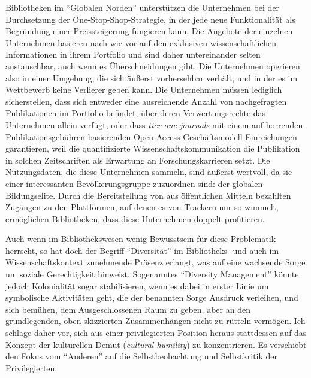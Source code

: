 \documentclass[a4paper,
fontsize=11pt,
oneside,
numbers=noperiodatend,
parskip=half-,
bibliography=totoc,
final
]{scrartcl}
\begin{document}
Bibliotheken im \enquote{Globalen Norden} unterstützen die Unternehmen
bei der Durchsetzung der One-Stop-Shop-Strategie, in der jede neue
Funktionalität als Begründung einer Preissteigerung fungieren kann. Die
Angebote der einzelnen Unternehmen basieren nach wie vor auf den
exklusiven wissenschaftlichen Informationen in ihrem Portfolio und sind
daher untereinander selten austauschbar, auch wenn es Überschneidungen
gibt. Die Unternehmen operieren also in einer Umgebung, die sich äußerst
vorhersehbar verhält, und in der es im Wettbewerb keine Verlierer geben
kann. Die Unternehmen müssen lediglich sicherstellen, dass sich entweder
eine ausreichende Anzahl von nachgefragten Publikationen im Portfolio
befindet, über deren Verwertungsrechte das Unternehmen allein verfügt,
oder dass \emph{tier one journals} mit einem auf horrenden
Publikationsgebühren basierenden Open-Access-Geschäftsmodell
Einreichungen garantieren, weil die quantifizierte
Wissenschaftskommunikation die Publikation in solchen Zeitschriften als
Erwartung an Forschungskarrieren setzt. Die Nutzungsdaten, die diese
Unternehmen sammeln, sind äußerst wertvoll, da sie einer interessanten
Bevölkerungsgruppe zuzuordnen sind: der globalen Bildungselite. Durch
die Bereitstellung von aus öffentlichen Mitteln bezahlten Zugängen zu
den Plattformen, auf denen es von Trackern nur so wimmelt, ermöglichen
Bibliotheken, dass diese Unternehmen doppelt profitieren.

Auch wenn im Bibliothekswesen wenig Bewusstsein für diese Problematik
herrscht, so hat doch der Begriff \enquote{Diversität} im Bibliotheks-
und auch im Wissenschaftskontext zunehmende Präsenz erlangt, was auf
eine wachsende Sorge um soziale Gerechtigkeit hinweist. Sogenanntes
\enquote{Diversity Management} könnte jedoch Kolonialität sogar
stabilisieren, wenn es dabei in erster Linie um symbolische Aktivitäten
geht, die der benannten Sorge Ausdruck verleihen, und sich bemühen, dem
Ausgeschlossenen Raum zu geben, aber an den grundlegenden, oben
skizzierten Zusammenhängen nicht zu rütteln vermögen. Ich schlage daher
vor, sich aus einer privilegierten Position heraus stattdessen auf das
Konzept der kulturellen Demut (\emph{cultural humility}) zu
konzentrieren. Es verschiebt den Fokus vom \enquote{Anderen} auf die
Selbstbeobachtung und Selbstkritik der Privilegierten.
\end{document}
